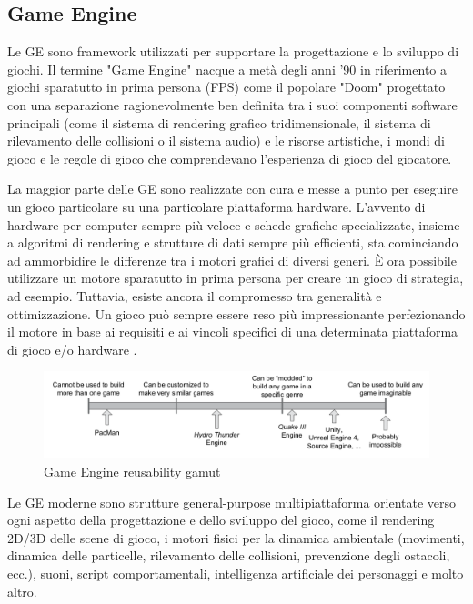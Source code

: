 \subsection{Game Engine}
Le GE sono framework utilizzati per supportare la progettazione e lo sviluppo di giochi. Il termine "Game Engine" nacque a metà degli anni '90 in riferimento a giochi sparatutto in prima persona (FPS) come il popolare "Doom" progettato con una separazione ragionevolmente ben definita tra i suoi componenti software principali (come il sistema di rendering grafico tridimensionale, il sistema di rilevamento delle collisioni o il sistema audio) e le risorse artistiche, i mondi di gioco e le regole di gioco che comprendevano l'esperienza di gioco del giocatore.

\medskip

La maggior parte delle GE sono realizzate con cura e messe a punto per eseguire un gioco particolare su una particolare piattaforma hardware.
L'avvento di hardware per computer sempre più veloce e schede grafiche specializzate, insieme a algoritmi di rendering e strutture di dati sempre più efficienti, sta cominciando ad ammorbidire le differenze tra i motori grafici di diversi generi. È ora possibile utilizzare un motore sparatutto in prima persona per creare un gioco di strategia, ad esempio. Tuttavia, esiste ancora il compromesso tra generalità e ottimizzazione. Un gioco può sempre essere reso più impressionante perfezionando il motore in base ai requisiti e ai vincoli specifici di una determinata piattaforma di gioco e/o hardware \cite{ge-architecture}.

\begin{figure}[H]
\centering
\includegraphics[width=\textwidth]{figures/Game_Engine_Reusability.png}
\caption{Game Engine reusability gamut \cite{ge-architecture}}
\end{figure}
\medskip

Le GE moderne sono strutture general-purpose multipiattaforma orientate verso ogni aspetto della progettazione e dello sviluppo del gioco, come il rendering 2D/3D delle scene di gioco, i motori fisici per la dinamica ambientale (movimenti, dinamica delle particelle, rilevamento delle collisioni, prevenzione degli ostacoli, ecc.), suoni, script comportamentali, intelligenza artificiale dei personaggi e molto altro.

